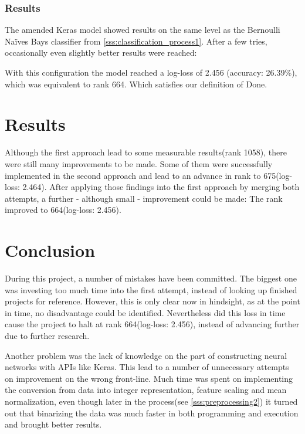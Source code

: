 \documentclass[12pt,a4paper]{scrartcl}
\begin{document}
\subsubsection{Results}\label{sss:results3}
The amended Keras model showed results on the same level as the Bernoulli Naïves Bays classifier from \ref{sss:classification_process1}. After a few tries, occasionally even slightly better results were reached:





With this configuration the model reached a log-loss of 2.456 (accuracy: 26.39\%), which was equivalent to rank 664. Which satisfies our definition of Done.

\pagebreak
\section{Results}\label{s:results}
Although the first approach lead to some measurable results(rank 1058), there were still many improvements to be made. Some of them were successfully implemented in the second approach and lead to an advance in rank to 675(log-loss: 2.464). After applying those findings into the first approach by merging both attempts, a further - although small - improvement could be made: The rank improved to 664(log-loss: 2.456).
\pagebreak

\section{Conclusion}\label{s:conclusion}
During this project, a number of mistakes have been committed. The biggest one was investing too much time into the first attempt, instead of looking up finished projects for reference. However, this is only clear now in hindsight, as at the point in time, no disadvantage could be identified. Nevertheless did this loss in time cause the project to halt at rank 664(log-loss: 2.456), instead of advancing further due to further research.

Another problem was the lack of knowledge on the part of constructing neural networks with APIs like Keras. This lead to a number of unnecessary attempts on improvement on the wrong front-line. Much time was spent on implementing the conversion from data into integer representation, feature scaling and mean normalization, even though later in the process(see \ref{sss:preprocessing2}) it turned out that binarizing the data was much faster in both programming and execution and brought better results.
\end{document}
